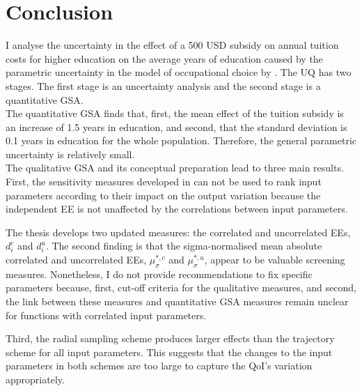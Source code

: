 \section{Conclusion}
\thispagestyle{plain}  %

\noindent
I analyse the uncertainty in the effect of a 500 USD subsidy on annual tuition costs for higher education on the average years of education caused by the parametric uncertainty in the model of occupational choice by \cite{Keane.1994}. The UQ has two stages. The first stage is an uncertainty analysis and the second stage is a quantitative GSA.\\

\noindent
The quantitative GSA finds that, first, the mean effect of the tuition subsidy is an increase of 1.5 years in education, and second, that the standard deviation is 0.1 years in education for the whole population. Therefore, the general parametric uncertainty is relatively small.\\

\noindent
The qualitative GSA and its conceptual preparation lead to three main results.
First, the sensitivity measures developed in \cite{ge2017extending} can not be used to rank input parameters according to their impact on the output variation because the independent EE is not unaffected by the correlations between input parameters.

The thesis develops two updated measures: the correlated and uncorrelated EEs, $d_i^{c}$ and $d_i^{u}$. The second finding is that the sigma-normalised mean absolute correlated and uncorrelated EEs, $\mu^{*,c}_{\sigma}$ and $\mu^{*,u}_{\sigma}$, appear to be valuable screening measures. Nonetheless, I do not provide recommendations to fix specific parameters because, first, cut-off criteria for the qualitative measures, and second, the link between these measures and quantitative GSA measures remain unclear for functions with correlated input parameters.


Third, the radial sampling scheme produces larger effects than the trajectory scheme for all input parameters. This suggests that the changes to the input parameters in both schemes are too large to capture the QoI's variation appropriately.